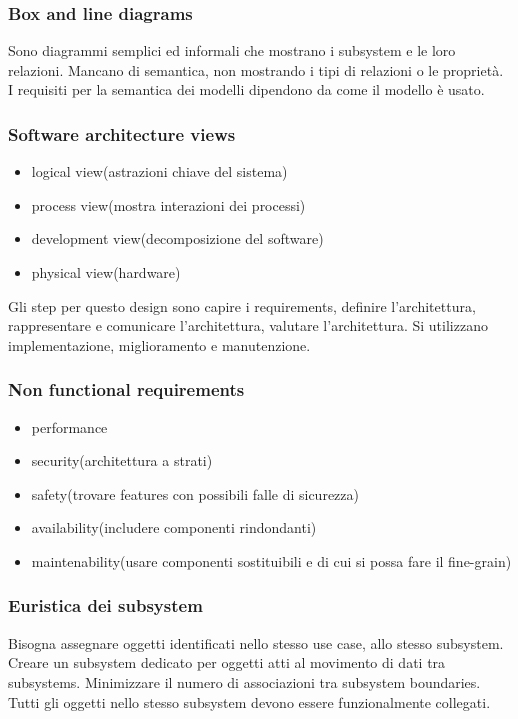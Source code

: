 \documentclass{article}
\begin{document}
\subsubsection{Box and line diagrams}
Sono diagrammi semplici ed informali che mostrano i subsystem e le loro relazioni. Mancano di semantica,
non mostrando i tipi di relazioni o le proprietà. I requisiti per la semantica dei modelli dipendono da come
il modello è usato.

\subsubsection{Software architecture views}
\begin{itemize}
    \item logical view(astrazioni chiave del sistema)
    \item process view(mostra interazioni dei processi)
    \item development view(decomposizione del software)
    \item physical view(hardware)
\end{itemize}

Gli step per questo design sono capire i requirements, definire l'architettura, rappresentare e
comunicare l'architettura, valutare l'architettura. Si utilizzano implementazione, miglioramento e
manutenzione.


\subsubsection{Non functional requirements}
\begin{itemize}
    \item performance
    \item security(architettura a strati)
    \item safety(trovare features con possibili falle di sicurezza)
    \item availability(includere componenti rindondanti)
    \item maintenability(usare componenti sostituibili e di cui si possa fare il fine-grain)
\end{itemize}


\subsubsection{Euristica dei subsystem}
Bisogna assegnare oggetti identificati nello stesso use case, allo stesso subsystem. Creare un subsystem
dedicato per oggetti atti al movimento di dati tra subsystems. Minimizzare il numero di associazioni tra
subsystem boundaries. Tutti gli oggetti nello stesso subsystem devono essere funzionalmente collegati.
\end{document}
